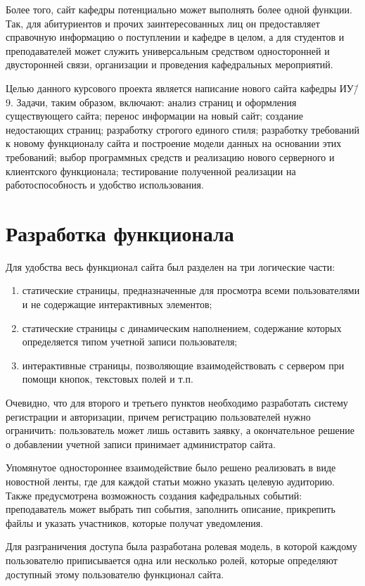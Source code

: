 \documentclass[14pt]{extarticle}
\begin{document}
Более того, сайт кафедры потенциально может выполнять более одной функции. Так, для абитуриентов и прочих заинтересованных лиц он предоставляет справочную информацию о поступлении и кафедре в целом, а для студентов и преподавателей может служить универсальным средством односторонней и двусторонней связи, организации и проведения кафедральных мероприятий.

Целью данного курсового проекта является написание нового сайта кафедры ИУ\=/9. Задачи, таким образом, включают: анализ страниц и оформления существующего сайта; перенос информации на новый сайт; создание недостающих страниц; разработку строгого единого стиля; разработку требований к новому функционалу сайта и построение модели данных на основании этих требований; выбор программных средств и реализацию нового серверного и клиентского функционала; тестирование полученной реализации на работоспособность и удобство использования.


\newpage
\section{Разработка функционала}
Для удобства весь функционал сайта был разделен на три логические части: 
\begin{enumerate}
\item статические страницы, предназначенные для просмотра всеми пользователями и не содержащие интерактивных элементов;
\item статические страницы с динамическим наполнением, содержание которых определяется типом учетной записи пользователя;
\item интерактивные страницы, позволяющие взаимодействовать с сервером при помощи кнопок, текстовых полей и т.п.
\end{enumerate}

Очевидно, что для второго и третьего пунктов необходимо разработать систему регистрации и авторизации, причем регистрацию пользователей нужно ограничить: пользователь может лишь оставить заявку, а окончательное решение о добавлении учетной записи принимает администратор сайта.

Упомянутое одностороннее взаимодействие было решено реализовать в виде новостной ленты, где для каждой статьи можно указать целевую аудиторию. Также предусмотрена возможность создания кафедральных событий: преподаватель может выбрать тип события, заполнить описание, прикрепить файлы и указать участников, которые получат уведомления.

Для разграничения доступа была разработана ролевая модель, в которой каждому пользователю приписывается одна или несколько ролей, которые определяют доступный этому пользователю функционал сайта.
\end{document}
